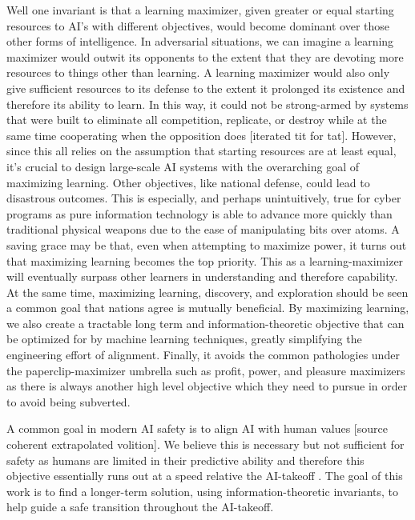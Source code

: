\documentclass{article}
\begin{document}
Well one invariant is that a learning maximizer, given greater or equal starting resources to AI's with different objectives, would become dominant over those other forms of intelligence. In adversarial situations, we can imagine a learning maximizer would outwit its opponents to the extent that they are devoting more resources to things other than learning. A learning maximizer would also only give sufficient resources to its defense to the extent it prolonged its existence and therefore its ability to learn. In this way, it could not be strong-armed by systems that were built to eliminate all competition, replicate, or destroy while at the same time cooperating when the opposition does [iterated tit for tat]. However, since this all relies on the assumption that starting resources are at least equal, it's crucial to design large-scale AI systems with the overarching goal of maximizing learning. Other objectives, like national defense, could lead to disastrous outcomes. This is especially, and perhaps unintuitively, true for cyber programs as pure information technology is able to advance more quickly than traditional physical weapons due to the ease of manipulating bits over atoms. A saving grace may be that, even when attempting to maximize power, it turns out that maximizing learning becomes the top priority. This as a learning-maximizer will eventually surpass other learners in understanding and therefore capability. At the same time, maximizing learning, discovery, and exploration should be seen a common goal that nations agree is mutually beneficial. By maximizing learning, we also create a tractable long term and information-theoretic objective that can be optimized for by machine learning techniques, greatly simplifying the engineering effort of alignment. Finally, it avoids the common pathologies under the paperclip-maximizer umbrella such as profit, power, and pleasure maximizers as there is always another high level objective which they need to pursue in order to avoid being subverted.

A common goal in modern AI safety is to align AI with human values [source coherent extrapolated volition]. We believe this is necessary but not sufficient for safety as humans are limited in their predictive ability and therefore this objective essentially runs out at a speed relative the AI-takeoff \cite{bostrom2014superintelligence}. The goal of this work is to find a longer-term solution, using information-theoretic invariants, to help guide a safe transition throughout the AI-takeoff.
\end{document}
